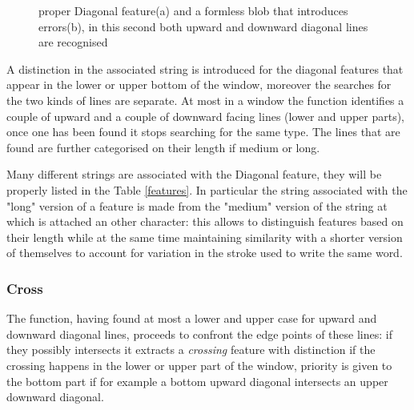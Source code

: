 \begin{figure}[!htpb]
 \centering
 \hspace{15mm}
 \caption{proper Diagonal feature(a) and a formless blob that introduces errors(b), in this second both upward and downward diagonal lines are recognised}
  \end{figure}
\vspace{2mm}
   
A distinction in the associated string is introduced for the diagonal features that appear in the lower or upper bottom of the window, moreover the searches for the two kinds of lines are separate.
At most in a window the function identifies a couple of upward and a couple of downward facing lines (lower and upper parts), once one has been found it stops searching for the same type.
The lines that are found are further categorised on their length if medium or long.

Many different strings are associated with the Diagonal feature, they will be properly listed in the Table \ref{features}.
In particular the string associated with the "long" version of a feature is made from the "medium" version of the string at which is attached an other character: this allows to distinguish features based on their length while at the same time maintaining similarity with a shorter version of themselves to account for variation in the stroke used to write the same word.  
 
\subsubsection{Cross}
The function, having found at most a lower and upper case for upward and downward diagonal lines, proceeds to confront the edge points of these lines: if they possibly intersects it extracts a \emph{crossing} feature with distinction if the crossing happens in the lower or upper part of the window, priority is given to the bottom part if for example a bottom upward diagonal intersects an upper downward diagonal. 

